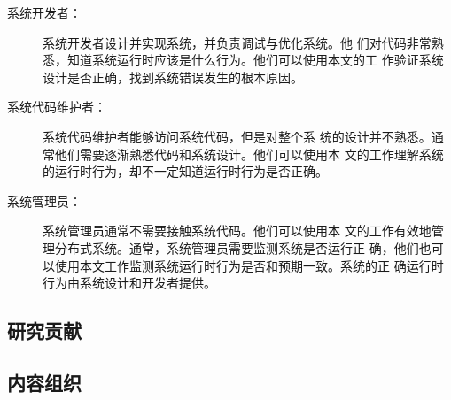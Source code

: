 \begin{description}

  \item[系统开发者：] 系统开发者设计并实现系统，并负责调试与优化系统。他
  们对代码非常熟悉，知道系统运行时应该是什么行为。他们可以使用本文的工
  作验证系统设计是否正确，找到系统错误发生的根本原因。

  \item[系统代码维护者：] 系统代码维护者能够访问系统代码，但是对整个系
  统的设计并不熟悉。通常他们需要逐渐熟悉代码和系统设计。他们可以使用本
  文的工作理解系统的运行时行为，却不一定知道运行时行为是否正确。

  \item[系统管理员：] 系统管理员通常不需要接触系统代码。他们可以使用本
  文的工作有效地管理分布式系统。通常，系统管理员需要监测系统是否运行正
  确，他们也可以使用本文工作监测系统运行时行为是否和预期一致。系统的正
  确运行时行为由系统设计和开发者提供。

\end{description}

\subsection{研究贡献}

\subsection{内容组织}

